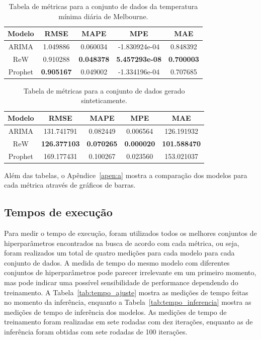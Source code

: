 \begin{table}[!htp]
    \caption{Tabela de métricas para a conjunto de dados da temperatura mínima diária de Melbourne.}\label{tab:temperature_results}
    \centering
    \begin{tabular}{@{}ccccc@{}} \toprule
        Modelo  & RMSE              & MAPE              & MPE                   & MAE               \\ \midrule
        ARIMA   & 1.049886          & 0.060034          & -1.830924e-04         & 0.848392          \\
        ReW     & 0.910288          & \textbf{0.048378} & \textbf{5.457293e-08} & \textbf{0.700003} \\
        Prophet & \textbf{0.905167} & 0.049002          & -1.334196e-04         & 0.707685          \\ \bottomrule
    \end{tabular}
\end{table}

\begin{table}[!htp]
    \caption{Tabela de métricas para a conjunto de dados gerado sinteticamente.}\label{tab:synthetic_results}
    \centering
    \begin{tabular}{@{}ccccc@{}} \toprule
        Modelo  & RMSE                & MAPE              & MPE               & MAE                 \\ \midrule
        ARIMA   & 131.741791          & 0.082449          & 0.006564          & 126.191932          \\
        ReW     & \textbf{126.377103} & \textbf{0.070265} & \textbf{0.000020} & \textbf{101.588470} \\
        Prophet & 169.177431          & 0.100267          & 0.023560          & 153.021037          \\ \bottomrule
    \end{tabular}
\end{table}

Além das tabelas, o Apêndice~\ref{apen:a} mostra a comparação dos modelos para cada métrica através de gráficos de barras.


\subsection{Tempos de execução}
Para medir o tempo de execução, foram utilizados todos os melhores conjuntos de hiperparâmetros encontrados na busca de acordo com cada métrica, ou seja, foram realizados um total de quatro medições para cada modelo para cada conjunto de dados. A medida de tempo do mesmo modelo com diferentes conjuntos de hiperparâmetros pode parecer irrelevante em um primeiro momento, mas pode indicar uma possível sensibilidade de performance dependendo do treinamento. A Tabela~\ref{tab:tempo_ajuste} mostra as medições de tempo feitas no momento da inferência, enquanto a Tabela~\ref{tab:tempo_inferencia} mostra as medições de tempo de inferência dos modelos. As medições de tempo de treinamento foram realizadas em sete rodadas com dez iterações, enquanto as de inferência foram obtidas com sete rodadas de 100 iterações.

